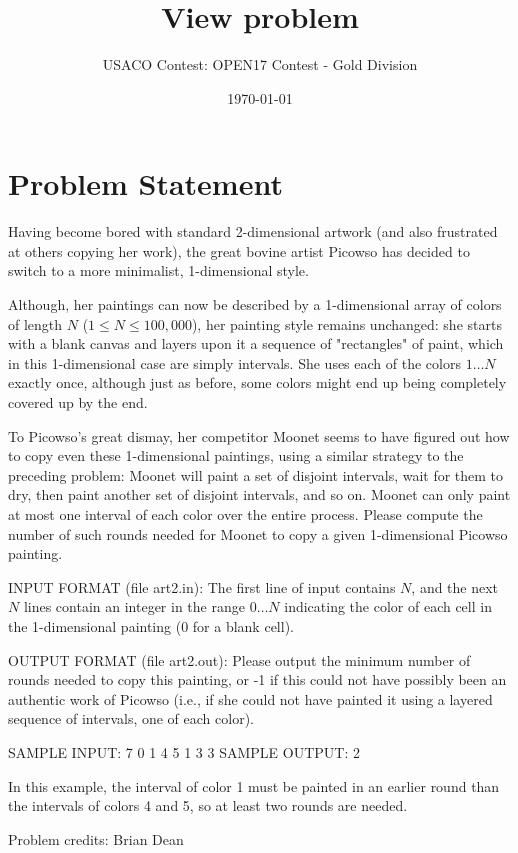\documentclass[12pt]{article}
\title{View problem}
\author{USACO Contest: OPEN17 Contest - Gold Division}
\date{\today}
\begin{document}
\maketitle

\section*{Problem Statement}

Having become bored with standard 2-dimensional artwork (and also frustrated at
others copying her work), the great bovine artist Picowso has decided to switch
to a more minimalist, 1-dimensional style.

Although, her paintings can now be described by a 1-dimensional array of colors
of length $N$ ($1 \leq N \leq 100,000$), her painting style remains unchanged:
she starts with a blank canvas and layers upon it a sequence of "rectangles" of
paint, which in this 1-dimensional case are simply intervals.  She uses each of
the colors $1 \ldots N$ exactly once, although just as before, some colors might
end up being completely  covered up by the end.

To Picowso's great dismay, her competitor Moonet seems to have figured out how
to copy even these 1-dimensional paintings, using a similar strategy to the
preceding problem: Moonet will paint a set of disjoint intervals, wait for them
to dry, then paint another  set of disjoint intervals, and so on.  Moonet can
only paint at most one interval of each color over the entire process.  Please compute
the number of such rounds needed for Moonet to copy a given 1-dimensional
Picowso painting.

INPUT FORMAT (file art2.in):
The first line of input contains $N$, and the next $N$ lines contain an integer
in the range $0 \ldots N$ indicating the color of each cell in the 1-dimensional
painting (0 for a blank cell).

OUTPUT FORMAT (file art2.out):
Please output the minimum number of rounds needed to copy this painting, or -1
if this could not have possibly been an authentic work of Picowso (i.e., if she
could not have painted it using a layered sequence of intervals, one of each
color).

SAMPLE INPUT:
7
0
1
4
5
1
3
3
SAMPLE OUTPUT: 
2

In this example, the interval of color 1 must be painted in an earlier round
than the intervals of colors 4 and 5, so at least two rounds are needed.


Problem credits: Brian Dean
\end{document}
